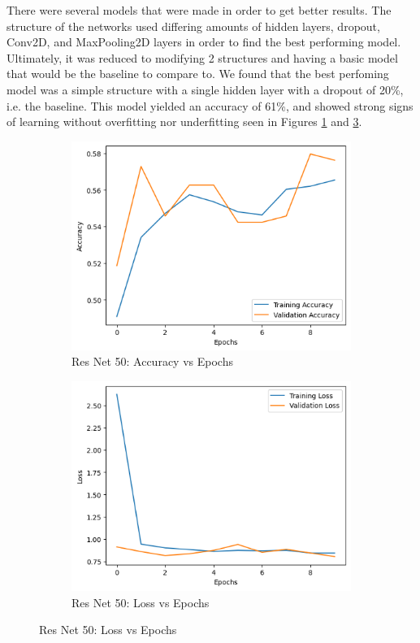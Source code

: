 There were several models that were made in order to get better results.
The structure of the networks used differing amounts of hidden layers, dropout, Conv2D, and MaxPooling2D layers in order to find the best performing model.
Ultimately, it was reduced to modifying 2 structures and having a basic model that would be the baseline to compare to.
We found that the best perfoming model was a simple structure with a single hidden layer with a dropout of 20\%, i.e. the baseline.
This model yielded an accuracy of 61\%, and showed strong signs of learning without overfitting nor underfitting seen in Figures \ref{fig:figure9a} and \ref{fig:figure9b}.


\begin{figure}[h]
    \begin{subfigure}{0.4\textwidth}
        \centering
        \includegraphics[scale=0.5]{resnet50_acc}
        \caption{Res Net 50: Accuracy vs Epochs}
        \label{fig:figure9a}
    \end{subfigure}
    \hspace{0.2\textwidth}
    \begin{subfigure}{0.4\textwidth}
        \centering
        \includegraphics[scale=0.5]{resnet50loss}
        \caption{Res Net 50: Loss vs Epochs}
        \label{fig:figure9b}
    \end{subfigure}
\end{figure}

